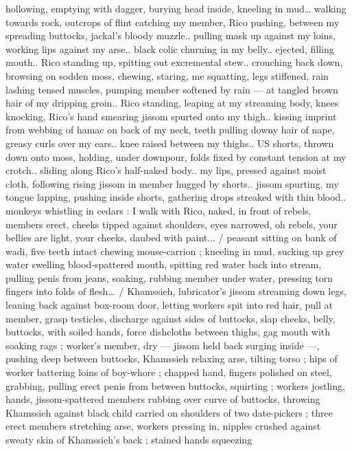 \documentclass[10pt,twoside]{memoir}
\begin{document}
hollowing, emptying with dagger, burying head inside, kneeling in 
mud{\ldots} walking towards rock, outcrops of flint catching my member, 
Rico pushing, between my spreading buttocks, jackal's bloody 
muzzle.. pulling mask up against my loins, working lips against my 
arse.. black colic churning in my belly.. ejected, filling mouth.. 
Rico standing up, spitting out excremental stew.. crouching back down,
browsing on sodden moss, chewing, staring, me squatting, legs 
stiffened, rain lashing tensed muscles, pumping member softened by 
rain --- at tangled brown hair of my dripping groin.. Rico standing, 
leaping at my streaming body, knees knocking, Rico's hand smearing 
jissom spurted onto my thigh.. kissing imprint from webbing of 
hamac on back of my neck, teeth pulling downy hair of nape, greasy 
curls over my ears.. knee raised between my thighs.. US shorts, 
thrown down onto moss, holding, under downpour, folds fixed by 
constant tension at my crotch.. sliding along Rico's half-naked body.. 
my lips, pressed against moist cloth, following rising jissom in 
member hugged by shorts.. jissom spurting, my tongue lapping, 
pushing inside shorts, gathering drops streaked with thin blood.. 
monkeys whistling in cedars : I walk with Rico, naked, in front of 
rebels, members erect, cheeks tipped against shoulders, eyes 
narrowed, oh rebels, your bellies are light, your cheeks, daubed with 
paint...{\gr} / peasant sitting on bank of wadi, five teeth intact chewing 
mouse-carrion ; kneeling in mud, sucking up grey water swelling %
blood-spattered mouth, spitting red water back into stream, pulling 
penis from jeans, soaking, rubbing member under water, pressing 
torn fingers into folds of flesh\ldots\ / Khamssieh, lubricator's jissom 
streaming down legs, leaning back against box-room door, letting 
workers spit into red hair, pull at member, grasp testicles, discharge 
against sides of buttocks, slap cheeks, belly, buttocks, with soiled 
hands, force dishcloths between thighs, gag mouth with soaking rags 
; worker's member, dry --- jissom held back surging inside ---, 
pushing deep between buttocks, Khamssieh relaxing arse, tilting 
torso ; hips of worker battering loins of boy-whore ; chapped hand, 
fingers polished on steel, grabbing, pulling erect penis from between 
buttocks, squirting ; workers jostling, hands, jissom-spattered 
members rubbing over curve of buttocks, throwing Khamssieh 
against black child carried on shoulders of two date-pickers ; three 
erect members stretching arse, workers pressing in, nipples crushed 
against sweaty skin of Khamssieh's back ; stained hands squeezing 
\end{document}
